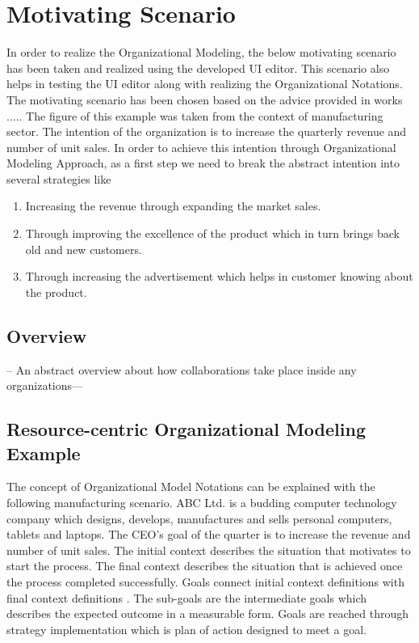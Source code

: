 \chapter{Motivating Scenario}
\label{chap:motivatingScenario}

In order to realize the Organizational Modeling, the below motivating scenario has been taken and realized using the developed UI editor.
This scenario also helps in testing the UI editor along with realizing the Organizational Notations. The motivating scenario has been chosen based on the advice provided in works ..... The figure of this example was taken from the context of manufacturing sector. The  intention of the organization is to increase the quarterly revenue and number of unit sales. In order to achieve this intention through Organizational Modeling Approach, as a first step we need to break the abstract intention into several strategies like
\begin{enumerate}
	\item Increasing the revenue through expanding the market sales. 
	\item Through improving the excellence of the product which in turn brings back old and new customers.
	\item Through increasing the advertisement which helps in customer knowing about the product.
\end{enumerate}

\section{Overview}
\label{sec:overview}
-- An abstract overview about how collaborations take place inside any organizations---
 





\section{Resource-centric Organizational Modeling Example}
 The concept of Organizational Model Notations can be explained with the following manufacturing scenario. ABC Ltd. is a budding computer technology company which designs, develops, manufactures and sells personal computers, tablets and laptops. The CEO's goal of the quarter is to increase the revenue and number of unit sales. The initial context describes the situation that motivates to start the process. The final context describes the situation that is achieved once the process completed successfully. Goals connect initial context definitions with final context definitions \cite{Sungur2014a}. The sub-goals are the intermediate goals which describes the expected outcome in a measurable form. Goals are reached through strategy implementation which is plan of action designed to meet a goal. 

